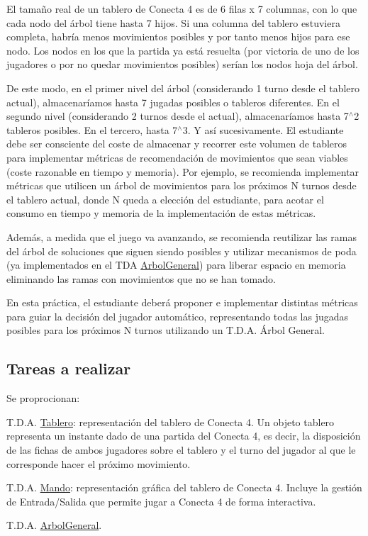 El tamaño real de un tablero de Conecta 4 es de 6 filas x 7 columnas, con lo que cada nodo del árbol tiene hasta 7 hijos. Si una columna del tablero estuviera completa, habría menos movimientos posibles y por tanto menos hijos para ese nodo. Los nodos en los que la partida ya está resuelta (por victoria de uno de los jugadores o por no quedar movimientos posibles) serían los nodos hoja del árbol.

De este modo, en el primer nivel del árbol (considerando 1 turno desde el tablero actual), almacenaríamos hasta 7 jugadas posibles o tableros diferentes. En el segundo nivel (considerando 2 turnos desde el actual), almacenaríamos hasta 7$^\wedge$2 tableros posibles. En el tercero, hasta 7$^\wedge$3. Y así sucesivamente. El estudiante debe ser consciente del coste de almacenar y recorrer este volumen de tableros para implementar métricas de recomendación de movimientos que sean viables (coste razonable en tiempo y memoria). Por ejemplo, se recomienda implementar métricas que utilicen un árbol de movimientos para los próximos N turnos desde el tablero actual, donde N queda a elección del estudiante, para acotar el consumo en tiempo y memoria de la implementación de estas métricas.

Además, a medida que el juego va avanzando, se recomienda reutilizar las ramas del árbol de soluciones que siguen siendo posibles y utilizar mecanismos de poda (ya implementados en el T\+DA \hyperlink{classArbolGeneral}{Arbol\+General}) para liberar espacio en memoria eliminando las ramas con movimientos que no se han tomado.

En esta práctica, el estudiante deberá proponer e implementar distintas métricas para guiar la decisión del jugador automático, representando todas las jugadas posibles para los próximos N turnos utilizando un T.\+D.\+A. Árbol General.\hypertarget{index_tareas}{}\subsection{Tareas a realizar}\label{index_tareas}
Se proprocionan\+:
\begin{DoxyEnumerate}
\item T.\+D.\+A. \hyperlink{classTablero}{Tablero}\+: representación del tablero de Conecta 4. Un objeto tablero representa un instante dado de una partida del Conecta 4, es decir, la disposición de las fichas de ambos jugadores sobre el tablero y el turno del jugador al que le corresponde hacer el próximo movimiento.
\item T.\+D.\+A. \hyperlink{classMando}{Mando}\+: representación gráfica del tablero de Conecta 4. Incluye la gestión de Entrada/\+Salida que permite jugar a Conecta 4 de forma interactiva.
\item T.\+D.\+A. \hyperlink{classArbolGeneral}{Arbol\+General}.
\end{DoxyEnumerate}

